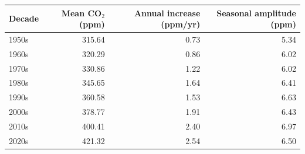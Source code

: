 \begin{tabular}{lrrr}
\toprule
Decade & Mean CO$_2$ (ppm) & Annual increase (ppm/yr) & Seasonal amplitude (ppm)\\
\midrule
1950s & 315.64 & 0.73 & 5.34\\
1960s & 320.29 & 0.86 & 6.02\\
1970s & 330.86 & 1.22 & 6.02\\
1980s & 345.65 & 1.64 & 6.41\\
1990s & 360.58 & 1.53 & 6.63\\
2000s & 378.77 & 1.91 & 6.43\\
2010s & 400.41 & 2.40 & 6.97\\
2020s & 421.32 & 2.54 & 6.50\\
\bottomrule
\end{tabular}
